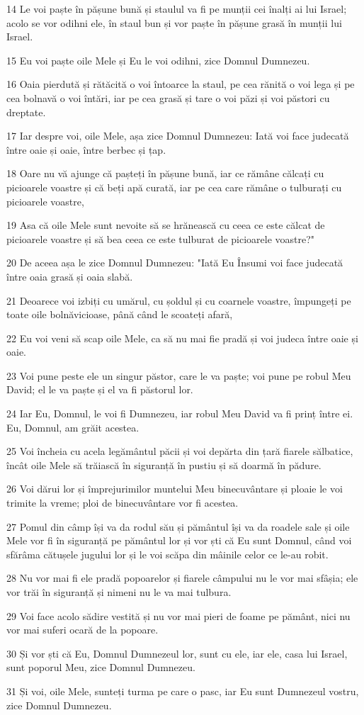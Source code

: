 \par 14 Le voi paște în pășune bună și staulul va fi pe munții cei înalți ai lui Israel; acolo se vor odihni ele, în staul bun și vor paște în pășune grasă în munții lui Israel.
\par 15 Eu voi paște oile Mele și Eu le voi odihni, zice Domnul Dumnezeu.
\par 16 Oaia pierdută și rătăcită o voi întoarce la staul, pe cea rănită o voi lega și pe cea bolnavă o voi întări, iar pe cea grasă și tare o voi păzi și voi păstori cu dreptate.
\par 17 Iar despre voi, oile Mele, așa zice Domnul Dumnezeu: Iată voi face judecată între oaie și oaie, între berbec și țap.
\par 18 Oare nu vă ajunge că pașteți în pășune bună, iar ce rămâne călcați cu picioarele voastre și că beți apă curată, iar pe cea care rămâne o tulburați cu picioarele voastre,
\par 19 Asa că oile Mele sunt nevoite să se hrănească cu ceea ce este călcat de picioarele voastre și să bea ceea ce este tulburat de picioarele voastre?"
\par 20 De aceea așa le zice Domnul Dumnezeu: "Iată Eu Însumi voi face judecată între oaia grasă și oaia slabă.
\par 21 Deoarece voi izbiți cu umărul, cu șoldul și cu coarnele voastre, împungeți pe toate oile bolnăvicioase, până când le scoateți afară,
\par 22 Eu voi veni să scap oile Mele, ca să nu mai fie pradă și voi judeca între oaie și oaie.
\par 23 Voi pune peste ele un singur păstor, care le va paște; voi pune pe robul Meu David; el le va paște și el va fi păstorul lor.
\par 24 Iar Eu, Domnul, le voi fi Dumnezeu, iar robul Meu David va fi prinț între ei. Eu, Domnul, am grăit acestea.
\par 25 Voi încheia cu acela legământul păcii și voi depărta din țară fiarele sălbatice, încât oile Mele să trăiască în siguranță în pustiu și să doarmă în pădure.
\par 26 Voi dărui lor și împrejurimilor muntelui Meu binecuvântare și ploaie le voi trimite la vreme; ploi de binecuvântare vor fi acestea.
\par 27 Pomul din câmp își va da rodul său și pământul își va da roadele sale și oile Mele vor fi în siguranță pe pământul lor și vor ști că Eu sunt Domnul, când voi sfărâma cătușele jugului lor și le voi scăpa din mâinile celor ce le-au robit.
\par 28 Nu vor mai fi ele pradă popoarelor și fiarele câmpului nu le vor mai sfâșia; ele vor trăi în siguranță și nimeni nu le va mai tulbura.
\par 29 Voi face acolo sădire vestită și nu vor mai pieri de foame pe pământ, nici nu vor mai suferi ocară de la popoare.
\par 30 Și vor ști că Eu, Domnul Dumnezeul lor, sunt cu ele, iar ele, casa lui Israel, sunt poporul Meu, zice Domnul Dumnezeu.
\par 31 Și voi, oile Mele, sunteți turma pe care o pasc, iar Eu sunt Dumnezeul vostru, zice Domnul Dumnezeu.

